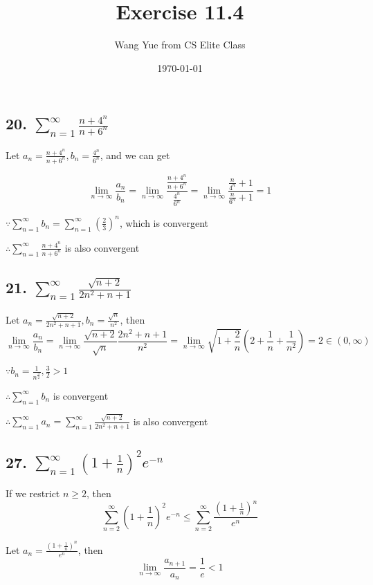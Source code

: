 \documentclass{article}
\begin{document}
    \title{Exercise 11.4}
    \author{Wang Yue from CS Elite Class}
    \date{\today}

    \maketitle

    \subsection*{20. $\sum_{n=1}^\infty \frac{n+4^n}{n+6^n}$}

    Let $a_n = \frac{n+4^n}{n+6^n}, b_n = \frac{4^n}{6^n}$, and we can get

    $$\lim_{n\to\infty} \frac{a_n}{b_n} = \lim_{n\to\infty} \frac{\frac{n+4^n}{n+6^n}}{\frac{4^n}{6^n}} = \lim_{n\to\infty}\frac{\frac{n}{4^n} + 1}{\frac{n}{6^n} + 1} = 1$$

    $\because \sum_{n=1}^\infty b_n = \sum_{n=1}^\infty(\frac 2 3)^n$, which is convergent

    $\therefore \sum_{n=1}^\infty \frac{n+4^n}{n+6^n}$ is also convergent

    \subsection*{21. $\sum_{n=1}^\infty \frac{\sqrt{n+2}}{2n^2 + n + 1}$}

    Let $a_n = \frac{\sqrt{n+2}}{2n^2+n+1}, b_n = \frac{\sqrt n}{n^2}$, then $$\lim_{n\to\infty}\frac{a_n}{b_n} = \lim_{n\to\infty}\frac{\sqrt{n+2}}{\sqrt n}\frac{2n^2+n+1}{n^2} = \lim_{n\to\infty}\sqrt{1+\frac 2 n}(2+\frac{1}{n} + \frac{1}{n^2}) = 2 \in (0, \infty)$$

    $\because b_n = \frac{1}{n^{\frac 3 2}}, \frac 3 2 > 1$

    $\therefore \sum_{n=1}^\infty b_n$ is convergent

    $\therefore \sum_{n=1}^\infty a_n = \sum_{n=1}^\infty \frac{\sqrt{n+2}}{2n^2+n+1}$ is also convergent

    \subsection*{27. $\sum_{n=1}^\infty (1+\frac 1 n)^2 e^{-n}$}

    If we restrict $n \geq 2$, then $$\sum_{n=2}^\infty (1+\frac 1 n)^2e^{-n} \leq \sum_{n=2}^\infty \frac{(1+\frac 1 n)^n}{e^n}$$

    Let $a_n = \frac{(1+\frac 1 n)^n}{e^n}$, then $$\lim_{n\to\infty}\frac{a_{n+1}}{a_n} = \frac{1}{e} < 1$$
\end{document}
